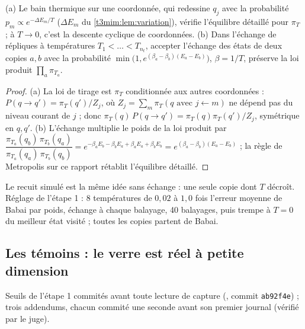 \begin{proposition}\label{t3mim:prop:gibbs}
(a) Le bain thermique sur une coordonnée, qui redessine $q_j$ avec la probabilité $p_m \propto e^{-\Delta E_m/T}$ ($\Delta E_m$ du \cref{t3mim:lem:variation}), vérifie l'équilibre détaillé pour $\pi_T$ ; à $T \to 0$, c'est la descente cyclique de coordonnées. (b) Dans l'échange de répliques à températures $T_1 < \dots < T_{n_t}$, accepter l'échange des états de deux copies $a, b$ avec la probabilité $\min\bigl(1, e^{(\beta_a - \beta_b)(E_a - E_b)}\bigr)$, $\beta = 1/T$, préserve la loi produit $\prod_a \pi_{T_a}$.
\end{proposition}
\begin{proof}
(a) La loi de tirage est $\pi_T$ conditionnée aux autres coordonnées : $P(q \to q') = \pi_T(q') / Z_j$, où $Z_j = \sum_m \pi_T(q \text{ avec } j \leftarrow m)$ ne dépend pas du niveau courant de $j$ ; donc $\pi_T(q)\,P(q \to q') = \pi_T(q)\pi_T(q')/Z_j$, symétrique en $q, q'$. (b) L'échange multiplie le poids de la loi produit par $\dfrac{\pi_{T_a}(q_b)\,\pi_{T_b}(q_a)}{\pi_{T_a}(q_a)\,\pi_{T_b}(q_b)} = e^{-\beta_a E_b - \beta_b E_a + \beta_a E_a + \beta_b E_b} = e^{(\beta_a - \beta_b)(E_a - E_b)}$ ; la règle de Metropolis sur ce rapport rétablit l'équilibre détaillé.
\end{proof}
Le recuit simulé est la même idée sans échange : une seule copie dont $T$ décroît. Réglage de l'étape 1 : 8 températures de $0{,}02$ à $1{,}0$ fois l'erreur moyenne de Babai par poids, échange à chaque balayage, 40 balayages, puis trempe à $T = 0$ du meilleur état visité ; toutes les copies partent de Babai.

\subsection{Les témoins : le verre est réel à petite dimension}\label{t3mim:sec:p5-temoins}

Seuils de l'étape 1 commités avant toute lecture de capture (, commit \texttt{ab92f4e}) ; trois addendums, chacun commité une seconde avant son premier journal (vérifié par le juge).

